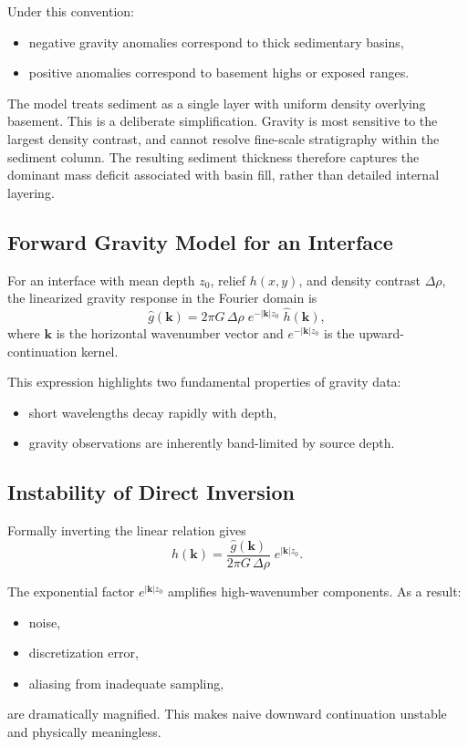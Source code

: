 \documentclass[11pt,a4paper]{article}
\begin{document}
Under this convention:
\begin{itemize}
  \item negative gravity anomalies correspond to thick sedimentary basins,
  \item positive anomalies correspond to basement highs or exposed ranges.
\end{itemize}

The model treats sediment as a single layer with uniform density overlying basement.
This is a deliberate simplification.
Gravity is most sensitive to the largest density contrast,
and cannot resolve fine-scale stratigraphy within the sediment column.
The resulting sediment thickness therefore captures the dominant mass deficit
associated with basin fill, rather than detailed internal layering.

\subsection{Forward Gravity Model for an Interface}

For an interface with mean depth $z_0$, relief $h(x,y)$, and density contrast
$\Delta\rho$, the linearized gravity response in the Fourier domain is
\begin{equation}
\hat{g}(\mathbf{k})
=
2\pi G\,\Delta\rho \;
e^{-|\mathbf{k}| z_0}
\;
\hat{h}(\mathbf{k}),
\end{equation}
where $\mathbf{k}$ is the horizontal wavenumber vector and
$e^{-|\mathbf{k}| z_0}$ is the upward-continuation kernel.

This expression highlights two fundamental properties of gravity data:
\begin{itemize}
  \item short wavelengths decay rapidly with depth,
  \item gravity observations are inherently band-limited by source depth.
\end{itemize}

\subsection{Instability of Direct Inversion}

Formally inverting the linear relation gives
\begin{equation}
\hat{h}(\mathbf{k})
=
\frac{\hat{g}(\mathbf{k})}
{2\pi G\,\Delta\rho}
\;
e^{|\mathbf{k}| z_0}.
\end{equation}

The exponential factor $e^{|\mathbf{k}| z_0}$ amplifies high-wavenumber components.
As a result:
\begin{itemize}
  \item noise,
  \item discretization error,
  \item aliasing from inadequate sampling,
\end{itemize}
are dramatically magnified.
This makes naive downward continuation unstable and physically meaningless.
\end{document}
